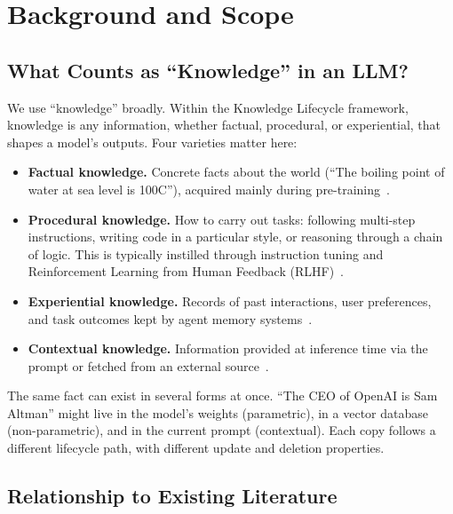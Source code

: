 \documentclass[10pt]{article}
\begin{document}
\section{Background and Scope}
\label{sec:background}

\subsection{What Counts as ``Knowledge'' in an LLM?}

We use ``knowledge'' broadly. Within the Knowledge Lifecycle framework, knowledge is any information, whether factual, procedural, or experiential, that shapes a model's outputs. Four varieties matter here:

\begin{itemize}[leftmargin=*]
  \item \textbf{Factual knowledge.} Concrete facts about the world (``The boiling point of water at sea level is 100\textdegree C''), acquired mainly during pre-training~\citep{petroni2019lama}.
  \item \textbf{Procedural knowledge.} How to carry out tasks: following multi-step instructions, writing code in a particular style, or reasoning through a chain of logic. This is typically instilled through instruction tuning and Reinforcement Learning from Human Feedback (RLHF)~\citep{ouyang2022instructgpt, wei2022flan}.
  \item \textbf{Experiential knowledge.} Records of past interactions, user preferences, and task outcomes kept by agent memory systems~\citep{park2023generative, packer2023memgpt}.
  \item \textbf{Contextual knowledge.} Information provided at inference time via the prompt or fetched from an external source~\citep{lewis2020rag}.
\end{itemize}

The same fact can exist in several forms at once. ``The CEO of OpenAI is Sam Altman'' might live in the model's weights (parametric), in a vector database (non-parametric), and in the current prompt (contextual). Each copy follows a different lifecycle path, with different update and deletion properties.

\subsection{Relationship to Existing Literature}
\end{document}
